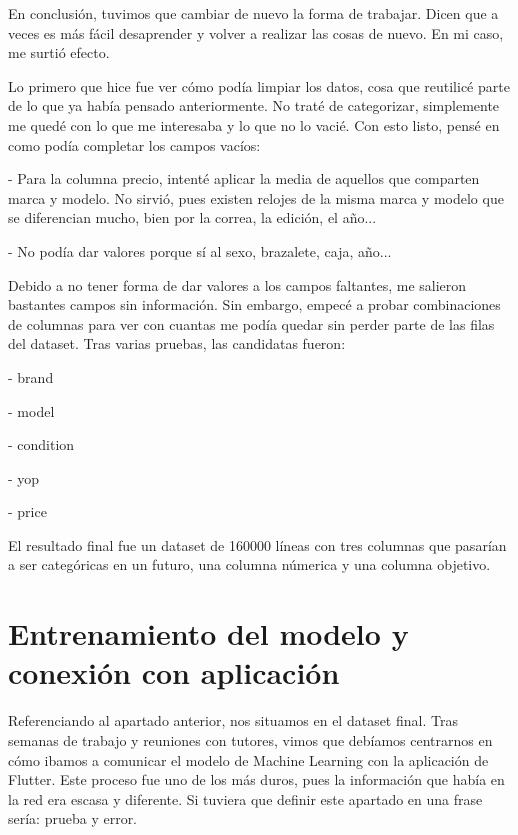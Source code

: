 	En conclusión, tuvimos que cambiar de nuevo la forma de trabajar. Dicen que a veces es más fácil desaprender y volver a realizar las cosas de nuevo. En mi caso, me surtió efecto.
	
		Lo primero que hice fue ver cómo podía limpiar los datos, cosa que reutilicé parte de lo que ya había pensado anteriormente. No traté de categorizar, simplemente me quedé con lo que me interesaba y lo que no lo vacié. Con esto listo, pensé en como podía completar los campos vacíos: 
		\begin{description}
		\item - Para la columna precio, intenté aplicar la media de aquellos que comparten marca y modelo. No sirvió, pues existen relojes de la misma marca y modelo que se diferencian mucho, bien por la correa, la edición, el año...
		\item - No podía dar valores porque sí al sexo, brazalete, caja, año...
	\end{description}
	Debido a no tener forma de dar valores a los campos faltantes, me salieron bastantes campos sin información. Sin embargo, empecé a probar combinaciones de columnas para ver con cuantas me podía quedar sin perder parte de las filas del dataset. Tras varias pruebas, las candidatas fueron:
		\begin{description}
		\item - brand
		\item - model
		\item - condition
		\item - yop
		\item - price
	\end{description}
	
	El resultado final fue un dataset de 160000 líneas con tres columnas que pasarían a ser categóricas en un futuro, una columna númerica y una columna objetivo.
	
		
\section{Entrenamiento del modelo y conexión con aplicación}

	Referenciando al apartado anterior, nos situamos en el dataset final. Tras semanas de trabajo y reuniones con tutores, vimos que debíamos centrarnos en cómo ibamos a comunicar el modelo de Machine Learning con la aplicación de Flutter. Este proceso fue uno de los más duros, pues la información que había en la red era escasa y diferente. Si tuviera que definir este apartado en una frase sería: prueba y error.
	
